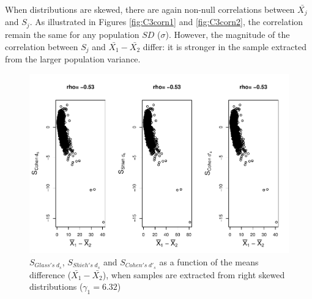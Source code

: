 \documentclass[
  man]{apa6}
\begin{document}
When distributions are skewed, there are again non-null correlations between \(\bar{X_j}\) and \(S_j\). As illustrated in Figures \ref{fig:C3corn1} and \ref{fig:C3corn2}, the correlation remain the same for any population \(SD\) (\(\sigma\)). However, the magnitude of the correlation between \(S_j\) and \(\bar{X_1}-\bar{X_2}\) differ: it is stronger in the sample extracted from the larger population variance.

\begin{figure}
\centering
\includegraphics{Correlations-between-the-sample-means-difference-and-standardizers-of-all-estimators,-and-implications-on-biases-and-variances-of-all-estimators_files/figure-latex/StdzrC3Rs-1.pdf}
\caption{\label{fig:StdzrC3Rs}\(S_{Glass's \; d_s}\), \(S_{Shieh's \; d_s}\) and \(S_{Cohen's \; d'_s}\) as a function of the means difference (\(\bar{X_1}-\bar{X_2}\)), when samples are extracted from right skewed distributions (\(\gamma_1 = 6.32\))}
\end{figure}
\end{document}
